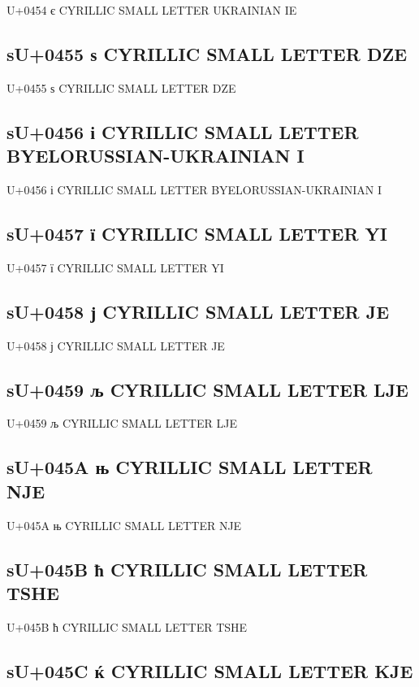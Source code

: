 U+0454 є  CYRILLIC SMALL LETTER UKRAINIAN IE

\subsection{sU+0455 ѕ  CYRILLIC SMALL LETTER DZE}

U+0455 ѕ  CYRILLIC SMALL LETTER DZE

\subsection{sU+0456 і  CYRILLIC SMALL LETTER BYELORUSSIAN-UKRAINIAN I}

U+0456 і  CYRILLIC SMALL LETTER BYELORUSSIAN-UKRAINIAN I

\subsection{sU+0457 ї  CYRILLIC SMALL LETTER YI}

U+0457 ї  CYRILLIC SMALL LETTER YI

\subsection{sU+0458 ј  CYRILLIC SMALL LETTER JE}

U+0458 ј  CYRILLIC SMALL LETTER JE

\subsection{sU+0459 љ  CYRILLIC SMALL LETTER LJE}

U+0459 љ  CYRILLIC SMALL LETTER LJE

\subsection{sU+045A њ  CYRILLIC SMALL LETTER NJE}

U+045A њ  CYRILLIC SMALL LETTER NJE

\subsection{sU+045B ћ  CYRILLIC SMALL LETTER TSHE}

U+045B ћ  CYRILLIC SMALL LETTER TSHE

\subsection{sU+045C ќ  CYRILLIC SMALL LETTER KJE}

